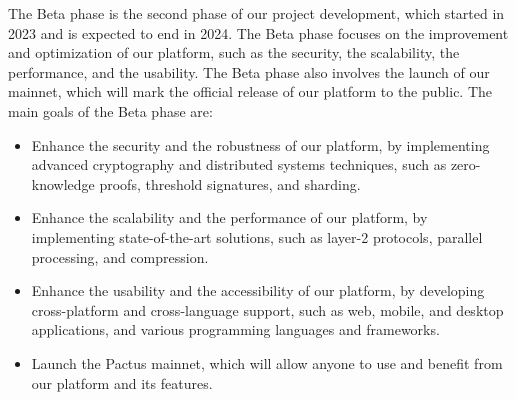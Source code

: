 \documentclass{novel}
\begin{document}
The Beta phase is the second phase of our project development, which started in 2023 and is expected to end in 2024. The Beta phase focuses on the improvement and optimization of our platform, such as the security, the scalability, the performance, and the usability. The Beta phase also involves the launch of our mainnet, which will mark the official release of our platform to the public. The main goals of the Beta phase are:
\begin{itemize}
  \item
    Enhance the security and the robustness of our platform, by implementing advanced cryptography and distributed systems techniques, such as zero-knowledge proofs, threshold signatures, and sharding.
  \item
    Enhance the scalability and the performance of our platform, by implementing state-of-the-art solutions, such as layer-2 protocols, parallel processing, and compression.
  \item
    Enhance the usability and the accessibility of our platform, by developing cross-platform and cross-language support, such as web, mobile, and desktop applications, and various programming languages and frameworks.
  \item
    Launch the Pactus mainnet, which will allow anyone to use and benefit from our platform and its features.

\end{itemize}
\end{document}
